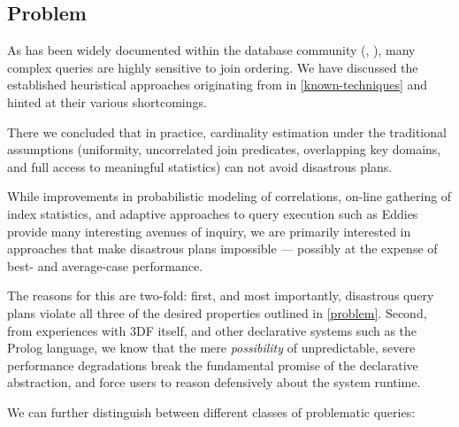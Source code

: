 \documentclass[../catalog.tex]{subfiles}
\begin{document}
\subsection{Problem}

As has been widely documented within the database community
(\cite{leis2015good}, \cite{lohman2014query}), many complex queries
are highly sensitive to join ordering. We have discussed the
established heuristical approaches originating from
\cite{selinger1979access} in \autoref{known-techniques} and hinted at
their various shortcomings.

There we concluded that in practice, cardinality estimation under the
traditional assumptions (uniformity, uncorrelated join predicates,
overlapping key domains, and full access to meaningful statistics) can
not avoid disastrous plans.

While improvements in probabilistic modeling of correlations, on-line
gathering of index statistics, and adaptive approaches to query
execution such as Eddies provide many interesting avenues of inquiry,
we are primarily interested in approaches that make disastrous plans
impossible — possibly at the expense of best- and average-case
performance.

The reasons for this are two-fold: first, and most importantly,
disastrous query plans violate all three of the desired properties
outlined in \ref{problem}. Second, from experiences with 3DF itself,
and other declarative systems such as the Prolog language, we know
that the mere \emph{possibility} of unpredictable, severe performance
degradations break the fundamental promise of the declarative
abstraction, and force users to reason defensively about the system
runtime.

We can further distinguish between different classes of problematic
queries:
\end{document}
